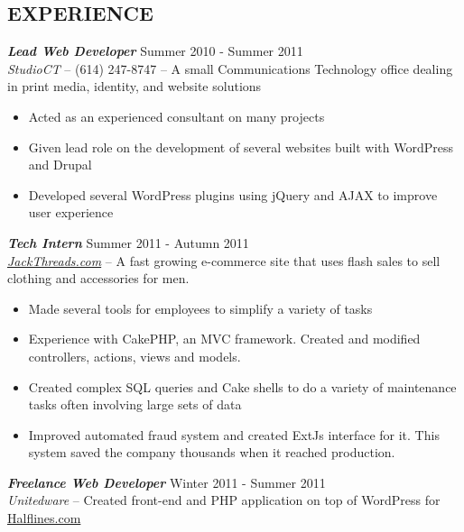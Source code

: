 \documentclass[line,letterpaper]{resume}
\begin{document}
\begin{resume}
    \vspace{-16pt}

    \section{\uppercase{Experience}} {\sl\textbf{Lead Web Developer}} \hfill
    Summer 2010 - Summer 2011\\
    \emph{StudioCT} -- (614) 247-8747 -- A small Communications Technology
    office dealing in print media, identity, and website solutions 
    \begin{itemize}  
        \item Acted as an experienced consultant on many projects
        \item Given lead role on the development of several websites built with
            WordPress and Drupal
        \item Developed several WordPress plugins using jQuery and AJAX to
            improve user experience
    \end{itemize}

    {\sl\textbf{Tech Intern}} \hfill Summer 2011 - Autumn 2011 \\
    \emph{\href{http://www.jackthreads.com/}{JackThreads.com}}
    -- A fast growing e-commerce site that uses flash sales to sell clothing and
    accessories for men.
    \begin{itemize}  
        \item Made several tools for employees to simplify a variety of tasks
        \item Experience with CakePHP, an MVC framework. Created and modified
            controllers, actions, views and models.
        \item Created complex SQL queries and Cake shells to do a variety of
            maintenance tasks often involving large sets of data
        \item Improved automated fraud system and created ExtJs interface for
            it. This system saved the company thousands when it reached
            production.
    \end{itemize} 

    {\sl\textbf{Freelance Web Developer}} \hfill Winter 2011 - Summer 2011\\
    \emph{Unitedware} -- Created front-end and PHP application on top of
    WordPress for \href{http://halflines.com/}{Halflines.com}


\end{resume}
\end{document}

